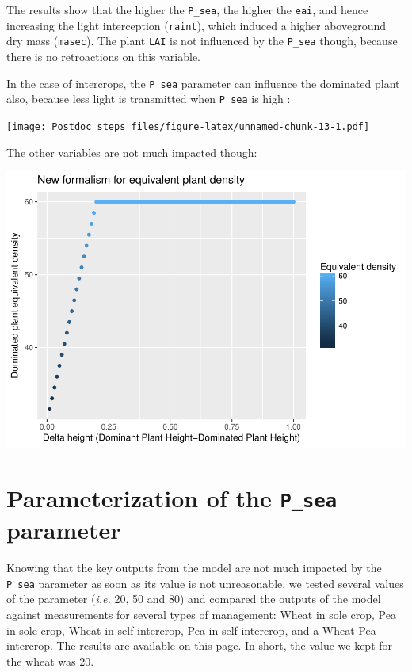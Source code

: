 \documentclass[]{book}
\theoremstyle{definition}
\theoremstyle{definition}
\theoremstyle{definition}
\theoremstyle{remark}
\begin{document}
The results show that the higher the \texttt{P\_sea}, the higher the
\texttt{eai}, and hence increasing the light interception
(\texttt{raint}), which induced a higher aboveground dry mass
(\texttt{masec}). The plant \texttt{LAI} is not influenced by the
\texttt{P\_sea} though, because there is no retroactions on this
variable.

In the case of intercrops, the \texttt{P\_sea} parameter can influence
the dominated plant also, because less light is transmitted when
\texttt{P\_sea} is high :

\texttt{[image: Postdoc\_steps\_files/figure-latex/unnamed-chunk-13-1.pdf]}

The other variables are not much impacted though:

\includegraphics{Postdoc_steps_files/figure-latex/unnamed-chunk-14-1.pdf}

\section{\texorpdfstring{Parameterization of the \texttt{P\_sea}
parameter}{Parameterization of the P\_sea parameter}}\label{parameterization-of-the-p_sea-parameter}

Knowing that the key outputs from the model are not much impacted by the
\texttt{P\_sea} parameter as soon as its value is not unreasonable, we
tested several values of the parameter (\emph{i.e.} 20, 50 and 80) and
compared the outputs of the model against measurements for several types
of management: Wheat in sole crop, Pea in sole crop, Wheat in
self-intercrop, Pea in self-intercrop, and a Wheat-Pea intercrop. The
results are available on \href{Wheat_EAI.html}{this page}. In short, the
value we kept for the wheat was 20.
\end{document}
